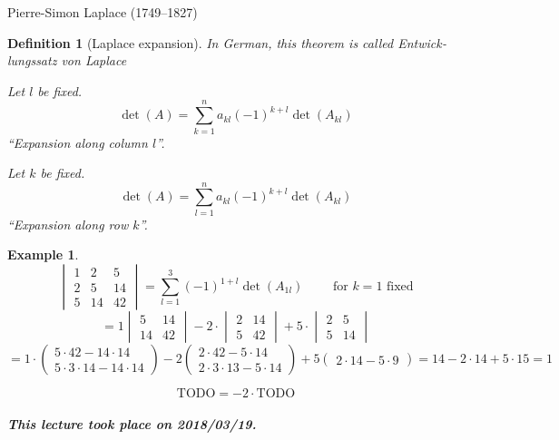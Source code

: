 \documentclass{article}
\newtheorem{example}{Example}  \numberwithin{example}{section}
\newtheorem{definition}{Definition}  \numberwithin{definition}{section}
\newcommand{\dateref}[1]{\paragraph{\textit{This lecture took place on #1.}}}
\begin{document}
Pierre-Simon Laplace (1749--1827)
\begin{definition}[Laplace expansion] %
  In German, this theorem is called \foreignlanguage{german}{Entwicklungssatz von Laplace}
  
  Let $l$ be fixed.
  \[ \det(A) = \sum_{k=1}^n a_{kl} (-1)^{k+l} \det(A_{kl}) \]
  \enquote{Expansion along column $l$}.

  Let $k$ be fixed.
  \[ \det(A) = \sum_{l=1}^n a_{kl} (-1)^{k+l} \det(A_{kl}) \]
  \enquote{Expansion along row $k$}.
\end{definition}

\begin{example} %
  \[
    \begin{vmatrix}
      1 & 2 & 5 \\
      2 & 5 & 14 \\
      5 & 14 & 42
    \end{vmatrix}
    = \sum_{l=1}^3 (-1)^{1+l} \det(A_{1l})
    \qquad \text{ for $k=1$ fixed}
  \]
  \[ = 1 \begin{vmatrix} 5 & 14 \\ 14 & 42 \end{vmatrix} - 2 \cdot \begin{vmatrix} 2 & 14 \\ 5 & 42 \end{vmatrix} + 5 \cdot \begin{vmatrix} 2 & 5 \\ 5 & 14 \end{vmatrix} \]
  \[ = 1 \cdot \begin{pmatrix} 5 \cdot 42 - 14 \cdot 14 \\ 5 \cdot 3 \cdot 14 - 14 \cdot 14 \end{pmatrix} - 2 \begin{pmatrix} 2 \cdot 42 - 5 \cdot 14 \\ 2 \cdot 3 \cdot 13 - 5 \cdot 14 \end{pmatrix} + 5 \begin{pmatrix} 2 \cdot 14 - 5 \cdot 9 \end{pmatrix} = 14 - 2 \cdot 14 + 5 \cdot 15 = 1 \]

  \[
    \text{TODO}
    = -2 \cdot \text{TODO}
  \]
\end{example}

\dateref{2018/03/19}
\end{document}
